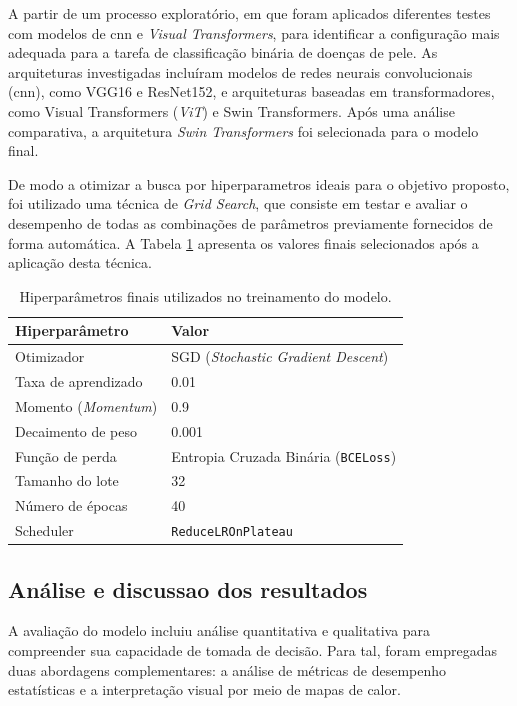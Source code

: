 A partir de um processo exploratório, em que foram aplicados diferentes testes com modelos de \gls{cnn} e \textit{Visual Transformers}, para identificar a configuração mais adequada para a tarefa de classificação binária de doenças de pele. As arquiteturas investigadas incluíram modelos de redes neurais convolucionais (\gls{cnn}), como VGG16 e ResNet152, e arquiteturas baseadas em transformadores, como Visual Transformers (\textit{ViT}) e Swin Transformers. Após uma análise comparativa, a arquitetura \textit{Swin Transformers} foi selecionada para o modelo final.

De modo a otimizar a busca por hiperparametros ideais para o objetivo proposto, foi utilizado uma técnica de \textit{Grid Search}, que consiste em testar e avaliar o desempenho de todas as combinações de parâmetros previamente fornecidos de forma automática. A Tabela \ref{tab:hiperparametros} apresenta os valores finais selecionados após a aplicação desta técnica.

\begin{table}[h]
    \centering
    \label{tab:hiperparametros}
    \begin{tabular}{ll}
        \toprule
        \textbf{Hiperparâmetro} & \textbf{Valor} \\
        \midrule
        Otimizador              & SGD (\textit{Stochastic Gradient Descent}) \\
        Taxa de aprendizado     & 0.01 \\
        Momento (\textit{Momentum})     & 0.9 \\
        Decaimento de peso      & 0.001 \\
        Função de perda         & Entropia Cruzada Binária (\texttt{BCELoss}) \\
        Tamanho do lote         & 32 \\
        Número de épocas        & 40 \\
        Scheduler               & \texttt{ReduceLROnPlateau} \\
        \bottomrule
    \end{tabular}
    \caption{Hiperparâmetros finais utilizados no treinamento do modelo.}
\end{table}


\subsection{Análise e discussao dos resultados}

A avaliação do modelo incluiu análise quantitativa e qualitativa para compreender sua capacidade de tomada de decisão. Para tal, foram empregadas duas abordagens complementares: a análise de métricas de desempenho estatísticas e a interpretação visual por meio de mapas de calor.

